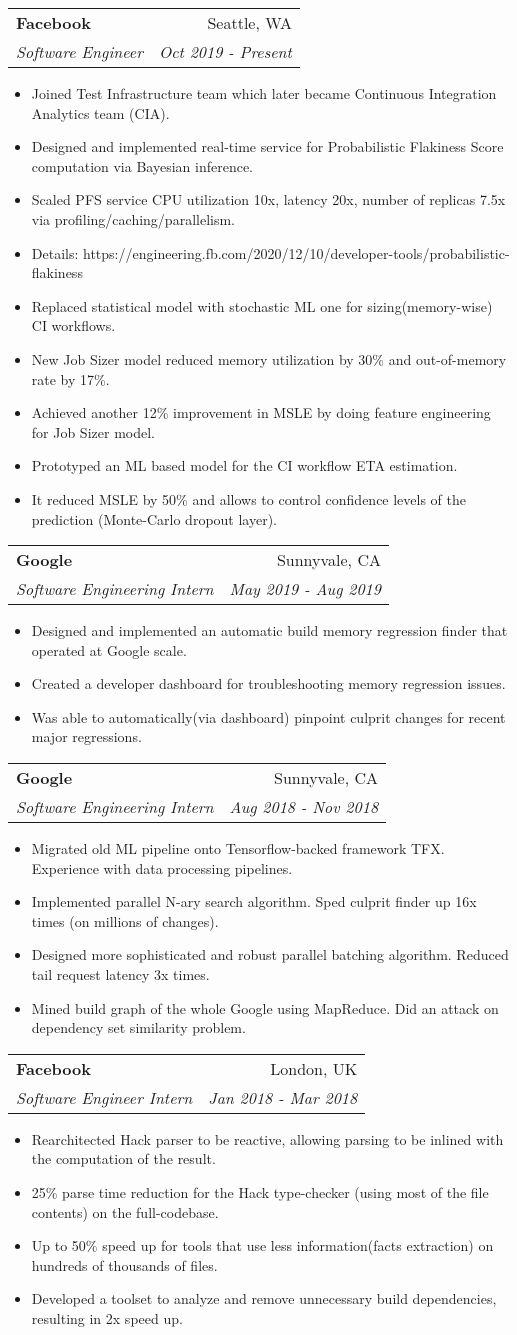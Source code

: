 \documentclass[letterpaper,11pt]{article}
\makeatletter
\newcommand{\resumeItem}[1]{
  \item\small{
    {#1 \vspace{-2pt}}
  }
}
\newcommand{\resumeSubheading}[4]{
  \vspace{-0pt}\item
    \begin{tabular*}{0.97\textwidth}{l@{\extracolsep{\fill}}r}
      \textbf{#1} & #2 \\
      \textit{\small#3} & \textit{\small #4} \\
    \end{tabular*}\vspace{-2pt}
}
\newcommand{\resumeItemListStart}{\begin{itemize}}
\newcommand{\resumeItemListEnd}{\end{itemize}\vspace{-0pt}}
\makeatother
\begin{document}
    \resumeSubheading
      {Facebook}{Seattle, WA}
      {Software Engineer}{Oct 2019 - Present}
      \resumeItemListStart
        \resumeItem{Joined Test Infrastructure team which later became Continuous Integration Analytics team (CIA).}
        \resumeItem{Designed and implemented real-time service for Probabilistic Flakiness Score computation via Bayesian inference.}
        \resumeItem{Scaled PFS service CPU utilization 10x, latency 20x, number of replicas 7.5x via profiling/caching/parallelism.}
        \resumeItem{Details: https://engineering.fb.com/2020/12/10/developer-tools/probabilistic-flakiness}
        \resumeItem{Replaced statistical model with stochastic ML one for sizing(memory-wise) CI workflows.}
        \resumeItem{New Job Sizer model reduced memory utilization by 30\% and out-of-memory rate by 17\%.}
        \resumeItem{Achieved another 12\% improvement in MSLE by doing feature engineering for Job Sizer model.}
        \resumeItem{Prototyped an ML based model for the CI workflow ETA estimation.}
        \resumeItem{It reduced MSLE by 50\% and allows to control confidence levels of the prediction (Monte-Carlo dropout layer).}
      \resumeItemListEnd

    \resumeSubheading
      {Google}{Sunnyvale, CA}
      {Software Engineering Intern}{May 2019 - Aug 2019}
      \resumeItemListStart
        \resumeItem{Designed and implemented an automatic build memory regression finder that operated at Google scale.}
        \resumeItem{Created a developer dashboard for troubleshooting memory regression issues.}
        \resumeItem{Was able to automatically(via dashboard) pinpoint culprit changes for recent major regressions.}
      \resumeItemListEnd

    \newpage

    \resumeSubheading
      {Google}{Sunnyvale, CA}
      {Software Engineering Intern}{Aug 2018 - Nov 2018}
      \resumeItemListStart
        \resumeItem{Migrated old ML pipeline onto Tensorflow-backed framework TFX. Experience with data processing pipelines.}
        \resumeItem{Implemented parallel N-ary search algorithm. Sped culprit finder up 16x times (on millions of changes).}
        \resumeItem{Designed more sophisticated and robust parallel batching algorithm. Reduced tail request latency 3x times.}
        \resumeItem{Mined build graph of the whole Google using MapReduce. Did an attack on dependency set similarity problem.}
      \resumeItemListEnd

    \resumeSubheading
      {Facebook}{London, UK}
      {Software Engineer Intern}{Jan 2018 - Mar 2018}
      \resumeItemListStart
        \resumeItem{Rearchitected Hack parser to be reactive, allowing parsing to be inlined with the computation of the result.}
        \resumeItem{25\% parse time reduction for the Hack type-checker (using most of the file contents) on the full-codebase.}
        \resumeItem{Up to 50\% speed up for tools that use less information(facts extraction) on hundreds of thousands of files.}
        \resumeItem{Developed a toolset to analyze and remove unnecessary build dependencies, resulting in 2x speed up.}
      \resumeItemListEnd
\end{document}
